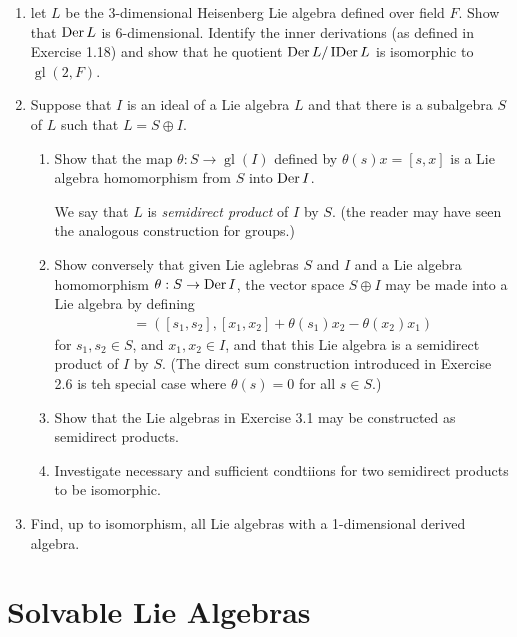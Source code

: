 \documentclass[12pt,a4paper]{report}
\newcommand{\GL}{\operatorname{gl}}
\newcommand{\IDER}{\operatorname{IDer}}
\begin{document}
\begin{enumerate}[label=3.\arabic*.]
\item let $L$ be the 3-dimensional Heisenberg Lie algebra defined over field $F$.  Show that $\operatorname{Der} L$ is 6-dimensional.  Identify the inner derivations (as defined in Exercise 1.18) and show that he quotient $\DER L/\IDER L$ is isomorphic to $\GL(2,F)$.

\item Suppose that $I$ is an ideal of a Lie algebra $L$ and that there is a subalgebra $S$ of $L$ such that $L=S\oplus I$.

\begin{enumerate}[label=(\roman*)]

	\item Show that the map $\theta : S \to \GL(I)$ defined by $\theta(s)x=[s,x]$ is a Lie algebra homomorphism from $S$ into $\operatorname{Der} I$.
	
	We say that $L$ is \textit{semidirect product} of $I$ by $S$.  (the reader may have seen the analogous construction for groups.)
	
	\item Show conversely that given Lie aglebras $S$ and $I$ and a Lie algebra homomorphism $\theta : S \to \operatorname{Der} I$, the vector space $S \oplus I$ may be made into a Lie algebra by defining
	\begin{align*}
		[(s_1,x_1),(s_2,x_2)] = ([s_1,s_2],[x_1,x_2]+\theta(s_1)x_2-\theta(x_2)x_1)
	\end{align*}for $s_1,s_2 \in S$, and $x_1,x_2 \in I$, and that this Lie algebra is a semidirect product of $I$ by $S$.  (The direct sum construction introduced in Exercise 2.6 is teh special case where $\theta(s)=0$ for all $s \in S$.)
	
	\item Show that the Lie algebras in Exercise 3.1 may be constructed as semidirect products.
	
	\item Investigate necessary and sufficient condtiions for two semidirect products to be isomorphic.

\end{enumerate}

\item Find, up to isomorphism, all Lie algebras with a 1-dimensional derived algebra.

\end{enumerate}

\chapter{Solvable Lie Algebras}
\end{document}

